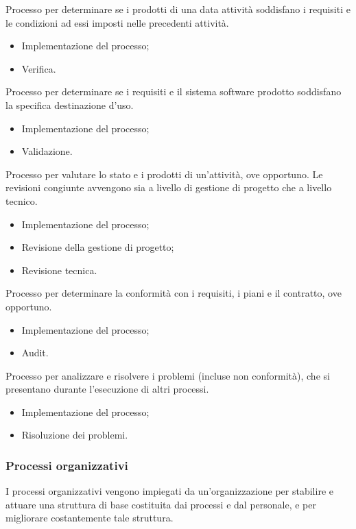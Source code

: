 Processo per determinare se i prodotti di una data attività soddisfano
i requisiti e le condizioni ad essi imposti nelle precedenti attività.
\begin{itemize}
    \item Implementazione del processo;
    \item Verifica.
\end{itemize}

Processo per determinare se i requisiti e il sistema software
prodotto soddisfano la specifica destinazione d'uso.
\begin{itemize}
    \item Implementazione del processo;
    \item Validazione.
\end{itemize}

Processo per valutare lo stato e i prodotti di un'attività, ove opportuno.
Le revisioni congiunte avvengono sia a livello di gestione di progetto che
a livello tecnico.
\begin{itemize}
    \item Implementazione del processo;
    \item Revisione della gestione di progetto;
    \item Revisione tecnica.
\end{itemize}

Processo per determinare la conformità con i requisiti, i piani 
e il contratto, ove opportuno.
\begin{itemize}
    \item Implementazione del processo;
    \item Audit.
\end{itemize}

Processo per analizzare e risolvere i problemi (incluse non conformità),
che si presentano durante l'esecuzione di altri processi. 
\begin{itemize}
    \item Implementazione del processo;
    \item Risoluzione dei problemi.
\end{itemize}

\subsubsection{Processi organizzativi}
I processi organizzativi vengono impiegati da un'organizzazione per stabilire 
e attuare una struttura di base costituita dai processi e dal personale,
e per migliorare costantemente tale struttura.

